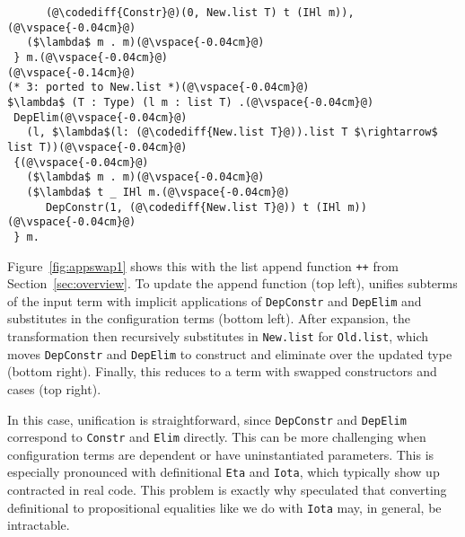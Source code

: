 \begin{figure*}
\begin{minipage}{0.49\textwidth}
\begin{lstlisting}
      (@\codediff{Constr}@)(0, New.list T) t (IHl m)),(@\vspace{-0.04cm}@)
   ($\lambda$ m . m)(@\vspace{-0.04cm}@)
 } m.(@\vspace{-0.04cm}@)
(@\vspace{-0.14cm}@)
(* 3: ported to New.list *)(@\vspace{-0.04cm}@)
$\lambda$ (T : Type) (l m : list T) .(@\vspace{-0.04cm}@)
 DepElim(@\vspace{-0.04cm}@)
   (l, $\lambda$(l: (@\codediff{New.list T}@)).list T $\rightarrow$ list T))(@\vspace{-0.04cm}@)
 {(@\vspace{-0.04cm}@)
   ($\lambda$ m . m)(@\vspace{-0.04cm}@)
   ($\lambda$ t _ IHl m.(@\vspace{-0.04cm}@)
      DepConstr(1, (@\codediff{New.list T}@)) t (IHl m))(@\vspace{-0.04cm}@)
 } m.
\end{lstlisting}
\end{minipage}
\vspace{-0.3cm}
\caption{Swapping cases of the append function, with names fully qualified only when needed for clarity, counterclockwise: 1) the input, 2) the term unified with the configuration, 3) the term ported to the updated type, and 4) the term reduced to the final output.}
\label{fig:appswap1}
\end{figure*}

Figure~\ref{fig:appswap1} shows this with the list append function \lstinline{++} from Section~\ref{sec:overview}.
To update the append function (top left), \toolname
unifies subterms of the input term with implicit applications of \lstinline{DepConstr} and \lstinline{DepElim} and substitutes
in the configuration terms (bottom left).
After expansion, the transformation then recursively substitutes in \lstinline{New.list}
for \lstinline{Old.list}, which moves \lstinline{DepConstr} and \lstinline{DepElim}
to construct and eliminate over the updated type (bottom right).
Finally, this reduces to a term with swapped constructors and cases (top right).

In this case, unification is straightforward, since \lstinline{DepConstr} and \lstinline{DepElim} correspond to
\lstinline{Constr} and \lstinline{Elim} directly.
This can be more challenging when configuration terms are dependent or have uninstantiated parameters.
This is especially pronounced with definitional \lstinline{Eta} and \lstinline{Iota},
which typically show up contracted in real code.
This problem is exactly why \citet{tabareau2019marriage} speculated that converting definitional to propositional equalities
like we do with \lstinline{Iota} may, in general, be intractable.

